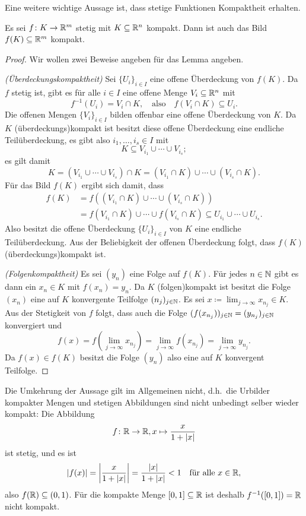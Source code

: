 \documentclass[a4paper,10pt]{article}
\begin{document}
Eine weitere wichtige Aussage ist, dass stetige Funktionen Kompaktheit erhalten.


\begin{lem}
 Es sei $f \colon K \to \mathbb{R}^m$ stetig mit $K \subseteq \mathbb{R}^n$ kompakt. Dann ist auch das Bild $f(K) \subseteq \mathbb{R}^m$ kompakt.
\end{lem}
\begin{proof}
 Wir wollen zwei Beweise angeben für das Lemma angeben.
 
 \emph{(Überdeckungskompaktheit)} Sei $\{U_i\}_{i \in I}$ eine offene Überdeckung von $f(K)$. Da $f$ stetig ist, gibt es für alle $i \in I$ eine offene Menge $V_i \subseteq \mathbb{R}^n$ mit
 \[
  f^{-1}(U_i) = V_i \cap K,
  \quad
  \text{also}
  \quad
  f(V_i \cap K) \subseteq U_i.
 \]
 Die offenen Mengen $\{V_i\}_{i \in I}$ bilden offenbar eine offene Überdeckung von $K$. Da $K$ (überdeckungs)kompakt ist besitzt diese offene Überdeckung eine endliche Teilüberdeckung, es gibt also $i_1, \dotsc, i_s \in I$ mit
 \[
  K \subseteq V_{i_1} \cup \dotsb \cup V_{i_s};
 \]
 es gilt damit
 \[
  K
  = (V_{i_1} \cup \dotsb \cup V_{i_s}) \cap K
  = (V_{i_1} \cap K) \cup \dotsb \cup (V_{i_s} \cap K).
 \]
 Für das Bild $f(K)$ ergibt sich damit, dass
 \begin{align*}
  f(K)
  &= f((V_{i_1} \cap K) \cup \dotsb \cup (V_{i_s} \cap K)) \\
  &= f(V_{i_1} \cap K) \cup \dotsb \cup f(V_{i_s} \cap K)
  \subseteq U_{i_1} \cup \dotsb \cup U_{i_s}.
 \end{align*}
 Also besitzt die offene Überdeckung $\{U_i\}_{i \in I}$ von $K$ eine endliche Teilüberdeckung. Aus der Beliebigkeit der offenen Überdeckung folgt, dass $f(K)$ (überdeckungs)kompakt ist.
 
 \emph{(Folgenkompaktheit)} Es sei $(y_n)$ eine Folge auf $f(K)$. Für jedes $n \in \mathbb{N}$ gibt es dann ein $x_n \in K$ mit $f(x_n) = y_n$. Da $K$ (folgen)kompakt ist besitzt die Folge $(x_n)$ eine auf $K$ konvergente Teilfolge $(n_j)_{j \in \mathbb{N}}$. Es sei $x \coloneqq \lim_{j \to \infty} x_{n_j} \in K$. Aus der Stetigkeit von $f$ folgt, dass auch die Folge $(f(x_{n_j}))_{j \in \mathbb{N}} = (y_{n_j})_{j \in \mathbb{N}}$ konvergiert und
 \[
  f(x)
  = f(\lim_{j \to \infty} x_{n_j})
  = \lim_{j \to \infty} f(x_{n_j})
  = \lim_{j \to \infty} y_{n_j}.
 \]
 Da $f(x) \in f(K)$ besitzt die Folge $(y_n)$ also eine auf $K$ konvergent Teilfolge.
\end{proof}


\begin{bem}
 Die Umkehrung der Aussage gilt im Allgemeinen nicht, d.h.\ die Urbilder kompakter Mengen und stetigen Abbildungen sind nicht unbedingt selber wieder kompakt: Die Abbildung
 \[
  f \colon \mathbb{R} \to \mathbb{R}, x \mapsto \frac{x}{1+|x|}
 \]
 ist stetig, und es ist
 \[
  |f(x)|
  = \left| \frac{x}{1+|x|} \right|
  = \frac{|x|}{1+|x|}
  < 1
  \quad
  \text{für alle $x \in \mathbb{R}$},
 \]
 also $f(\mathbb{R}) \subseteq (0,1)$. Für die kompakte Menge $[0,1] \subseteq \mathbb{R}$ ist deshalb $f^{-1}([0,1]) = \mathbb{R}$ nicht kompakt.
\end{bem}
\end{document}

